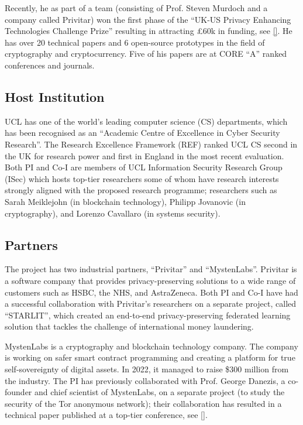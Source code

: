 Recently, he as part of a team (consisting of Prof. Steven Murdoch and a company called Privitar) won the first phase of the “UK-US Privacy Enhancing Technologies Challenge Prize” resulting in attracting £60k in funding, see \href{https://www.ucl.ac.uk/computer-science/news/2022/dec/ucl-computer-sciences-success-privacy-enhancing-technologies-challenge}{[\x]}.  He has over 20 technical papers and 6 open-source prototypes in the field of cryptography and cryptocurrency. Five of his papers are at CORE “A” ranked conferences and journals.


\subsection{Host Institution}
UCL has one of the world's leading computer science (CS) departments, which has been recognised as an “Academic Centre of Excellence in Cyber Security Research”. The Research Excellence Framework (REF) ranked UCL CS second in the UK for research power and first in England in the most recent evaluation. Both PI and Co-I are members of UCL Information Security Research Group (ISec) which hosts top-tier researchers some of whom have research interests strongly aligned with the proposed research programme; researchers such as  Sarah Meiklejohn  (in blockchain technology), Philipp Jovanovic (in cryptography), and Lorenzo Cavallaro (in systems security). 


\subsection{Partners}
The project has two industrial partners, ``Privitar'' and ``MystenLabs''. Privitar is a software company that provides privacy-preserving solutions to a wide range of customers such as HSBC, the NHS, and AstraZeneca. Both PI and Co-I have had a successful collaboration with Privitar's researchers on a separate project, called ``STARLIT'', which created an end-to-end privacy-preserving federated learning solution that tackles the challenge of international money laundering. 

MystenLabs is a cryptography and blockchain technology company. The company is working on safer smart contract programming and creating a platform for true self-sovereignty of digital assets. In 2022, it managed to raise \$300 million from the industry. The PI has previously collaborated with 
Prof. George Danezis, a co-founder and chief scientist of MystenLabs, on a separate project (to study the security of the Tor anonymous network); their collaboration has resulted in a technical paper published at a top-tier conference, see \href{https://ieeexplore.ieee.org/stamp/stamp.jsp?tp=&arnumber=1425067}{[\x]}.  

